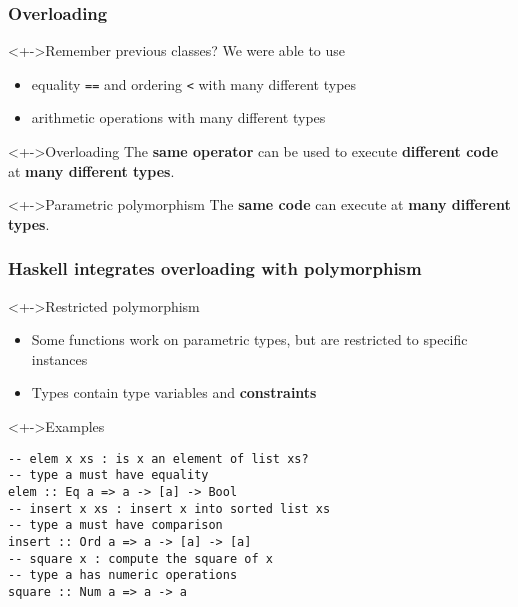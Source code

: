 \documentclass{beamer}
\subtitle{Type Classes --- Overloading in Haskell}
\begin{document}
\begin{frame}
  \titlepage
\end{frame}
\begin{frame}[fragile]
  \frametitle{Overloading}
  \begin{block}<+->{Remember previous classes?}
    We were able to use
    \begin{itemize}
    \item equality \texttt{==} and ordering \texttt{<} with many different types
    \item arithmetic operations with many different types
    \end{itemize}
  \end{block}
  \begin{block}<+->{Overloading}
    The \textbf{same operator} can be used to execute \textbf{different code} at \textbf{many different types}. 
  \end{block}
  \begin{block}<+->{Parametric polymorphism}
    The \textbf{same code} can execute at \textbf{many different types}.
  \end{block}
\end{frame}
\begin{frame}[fragile]
  \frametitle{Haskell integrates overloading with polymorphism}
  \begin{block}<+->{Restricted polymorphism}
    \begin{itemize}
    \item Some functions work on parametric types, but are restricted to specific instances
    \item Types contain type variables and \textbf{constraints}
    \end{itemize}
  \end{block}
  \begin{block}<+->{Examples}
\begin{lstlisting}
-- elem x xs : is x an element of list xs?
-- type a must have equality
elem :: Eq a => a -> [a] -> Bool
-- insert x xs : insert x into sorted list xs
-- type a must have comparison
insert :: Ord a => a -> [a] -> [a]
-- square x : compute the square of x
-- type a has numeric operations
square :: Num a => a -> a
\end{lstlisting}
  \end{block}
\end{frame}
\end{document}
